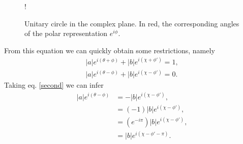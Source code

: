 \begin{wrapfigure}[14]{l}{0.40\textwidth} %
   \begin{center}
     \resizebox {0.35\columnwidth} {!} {
}
   \end{center}
   \caption{Unitary circle in the complex plane. In red, the corresponding angles of the polar representation $e^{i\phi}$.}
   \label{circle2}
 \end{wrapfigure}
From this equation we can quickly obtain some restrictions, namely
\begin{eqnarray}
    |a|e^{i(\theta+\phi)} + |b|e^{i(\chi+\phi')} = 1,\label{first}\\
    |a|e^{i(\theta-\phi)} +  |b|e^{i(\chi-\phi')} = 0.\label{second}
\end{eqnarray}
Taking eq. \ref{second} we can infer
\begin{equation*}
\begin{aligned}
    |a|e^{i(\theta-\phi)} &=-  |b|e^{i(\chi-\phi')} ,\\
    &= (-1)|b|e^{i(\chi-\phi')} ,\\
    &= (e^{-i\pi})|b|e^{i(\chi-\phi')} ,\\
    &= |b|e^{i(\chi-\phi'-\pi)}.
    \end{aligned}
\end{equation*}
